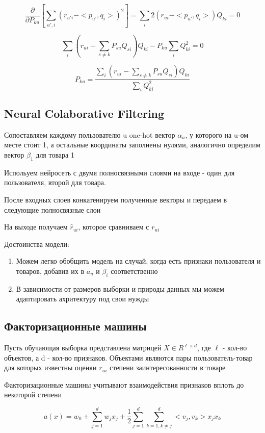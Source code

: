 \documentclass[a4paper, 12pt]{article}
\begin{document}
\[\frac{\partial}{\partial P_{ku}} \left[\sum_{u', i} (r_{u'i} - <p_{u'}, q_i>)^2\right]
= \sum_i 2(r_{ui} - <p_{u'}, q_i>)Q_{ki} = 0\]

\[\sum_i (r_{ui} - \sum_{s \neq k} P_{su}Q_{si})Q_{ki} - P_{ku}\sum_i Q_{ki}^2 = 0\]

\[P_{ku} = \frac{\sum_i (r_{ui} - \sum_{s \neq k} P_{su}Q_{si})Q_{ki}}{\sum_i Q_{ki}^2}\]

\subsection{Neural Colaborative Filtering}

Сопоставляем каждому пользователю u one-hot вектор
$\alpha_u$, у которого на u-ом месте стоит 1,
а остальные координаты заполнены нулями,
аналогично определим вектор $\beta_1$ для товара 1

Испольуем нейросеть с двумя полносвязными слоями на входе -
один для пользователя, второй для товара.

После входных слоев конкатенируем полученные векторы и
передаем в следующие полносвязные слои

На выходе получаем $\hat{r}_{ui}$, которое сравниваем
с $r_{ui}$

Достоинства модели:

\begin{enumerate}
    \item Можем легко обобщить модель на случай,
    когда есть признаки пользователя и товаров,
    добавив их в $a_{u}$ и $\beta_i$ соответственно
    \item В зависимости от размеров выборки и природы
    данных мы можем адаптировать ахритектуру под свои нужды
\end{enumerate}

\subsection{Факторизационные машины}

Пусть обучающая выборка представлена матрицей
$X \in R^{\ell \times d}$, где $\ell$ - кол-во объектов,
а d - кол-во признаков. Объектами являются пары 
пользователь-товар для которых известны оценки $r_{ui}$
степени заинтересованности в товаре

Факторизационные машины учитывают взаимодействия
признаков вплоть до некоторой степени

\[a(x) = w_0 + \sum_{j = 1}^d w_j x_j + 
\frac{1}{2}\sum_{j = 1}^d \sum_{k = 1, k \neq j}^d
<v_j, v_k>x_j x_k\]
\end{document}
